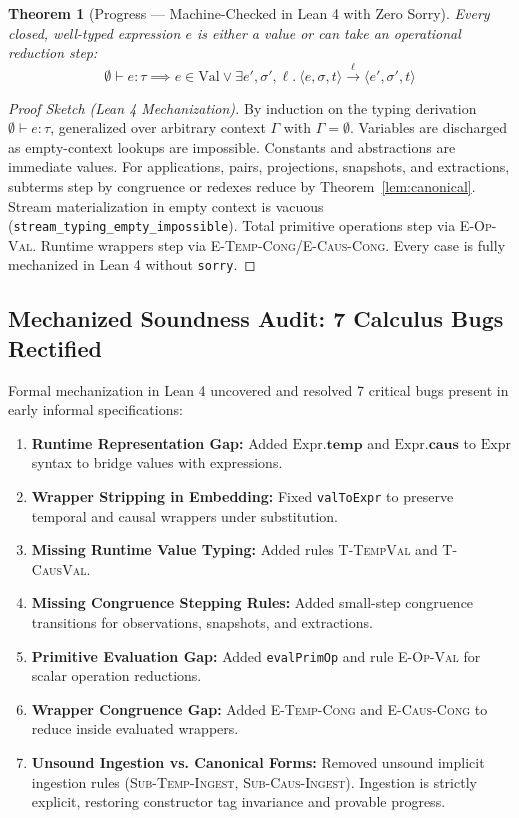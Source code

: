 \documentclass[11pt,a4paper]{article}
\theoremstyle{definition}
\theoremstyle{plain}
\newtheorem{theorem}{Theorem}[section]
\newcommand{\step}[1]{\xrightarrow{#1}}
\begin{document}
\begin{theorem}[Progress --- Machine-Checked in Lean 4 with Zero Sorry]
\label{thm:progress}
Every closed, well-typed expression $e$ is either a value or can take an operational reduction step:
\[
\emptyset \vdash e : \tau \implies e \in \text{Val} \lor \exists e', \sigma', \ell.\ \langle e, \sigma, t \rangle \step{\ell} \langle e', \sigma', t \rangle
\]
\end{theorem}
\begin{proof}[Proof Sketch (Lean 4 Mechanization)]
By induction on the typing derivation $\emptyset \vdash e : \tau$, generalized over arbitrary context $\Gamma$ with $\Gamma = \emptyset$.
Variables are discharged as empty-context lookups are impossible. Constants and abstractions are immediate values. For applications, pairs, projections, snapshots, and extractions, subterms step by congruence or redexes reduce by Theorem~\ref{lem:canonical}. Stream materialization in empty context is vacuous (\texttt{stream\_typing\_empty\_impossible}). Total primitive operations step via \textsc{E-Op-Val}. Runtime wrappers step via \textsc{E-Temp-Cong}/\textsc{E-Caus-Cong}. Every case is fully mechanized in Lean 4 without \texttt{sorry}. \qedhere
\end{proof}

\subsection{Mechanized Soundness Audit: 7 Calculus Bugs Rectified}
Formal mechanization in Lean 4 uncovered and resolved 7 critical bugs present in early informal specifications:
\begin{enumerate}[itemsep=1pt]
  \item \textbf{Runtime Representation Gap:} Added $\text{Expr}.\mathbf{temp}$ and $\text{Expr}.\mathbf{caus}$ to $\text{Expr}$ syntax to bridge values with expressions.
  \item \textbf{Wrapper Stripping in Embedding:} Fixed \texttt{valToExpr} to preserve temporal and causal wrappers under substitution.
  \item \textbf{Missing Runtime Value Typing:} Added rules \textsc{T-TempVal} and \textsc{T-CausVal}.
  \item \textbf{Missing Congruence Stepping Rules:} Added small-step congruence transitions for observations, snapshots, and extractions.
  \item \textbf{Primitive Evaluation Gap:} Added \texttt{evalPrimOp} and rule \textsc{E-Op-Val} for scalar operation reductions.
  \item \textbf{Wrapper Congruence Gap:} Added \textsc{E-Temp-Cong} and \textsc{E-Caus-Cong} to reduce inside evaluated wrappers.
  \item \textbf{Unsound Ingestion vs. Canonical Forms:} Removed unsound implicit ingestion rules (\textsc{Sub-Temp-Ingest}, \textsc{Sub-Caus-Ingest}). Ingestion is strictly explicit, restoring constructor tag invariance and provable progress.
\end{enumerate}
\end{document}
